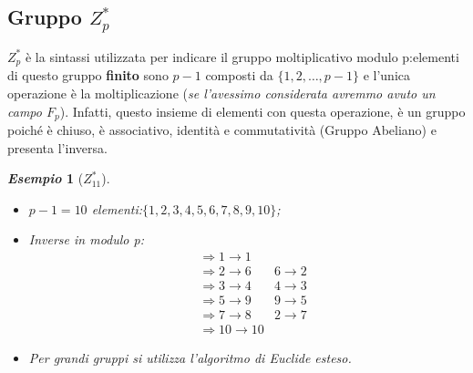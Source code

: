 \documentclass{book}
\newtheorem{esempio}{\emph{Esempio}}
\begin{document}
\subsection{Gruppo \(Z_{p}^{*}\)}
\(Z_{p}^{*}\) è la sintassi utilizzata per indicare il gruppo moltiplicativo modulo p:\@gli elementi di questo gruppo \textbf{finito} sono \(p-1\) composti da \( \{ 1,2,\ldots,p-1\} \) e l'unica operazione è la moltiplicazione (\emph{se l'avessimo considerata avremmo avuto un campo \(F_{p}\)})\@.\newline
Infatti, questo insieme di elementi con questa operazione, è un gruppo poiché è chiuso, è associativo, identità e commutatività (Gruppo Abeliano) e presenta l'inversa\@.
\begin{esempio}[\(Z_{11}^{*}\)]
	\begin{itemize}
		\item \(p-1=10\) elementi:\( \{1,2,3,4,5,6,7,8,9,10 \} \);
		\item Inverse in modulo p:\begin{align*}
			       & \Rightarrow 1\rightarrow 1                        \\
			       & \Rightarrow 2\rightarrow 6\quad & 6 \rightarrow 2 \\
			       & \Rightarrow 3\rightarrow 4\quad & 4 \rightarrow 3 \\
			       & \Rightarrow 5\rightarrow 9\quad & 9 \rightarrow 5 \\
			       & \Rightarrow 7\rightarrow 8\quad & 2 \rightarrow 7 \\
			       & \Rightarrow 10\rightarrow 10
		      \end{align*}
		\item Per grandi gruppi si utilizza l'algoritmo di Euclide esteso.
	\end{itemize}
\end{esempio}
\end{document}
